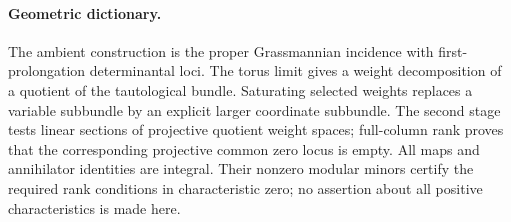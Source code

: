 \paragraph{Geometric dictionary.}
The ambient construction is the proper Grassmannian
incidence with first-prolongation determinantal loci.
The torus limit gives a weight decomposition of a quotient
of the tautological bundle. Saturating selected weights
replaces a variable subbundle by an explicit larger
coordinate subbundle. The second stage tests linear
sections of projective quotient weight spaces; full-column
rank proves that the corresponding projective common zero
locus is empty. All maps and annihilator identities are
integral. Their nonzero modular minors certify the required
rank conditions in characteristic zero; no assertion about
all positive characteristics is made here.
